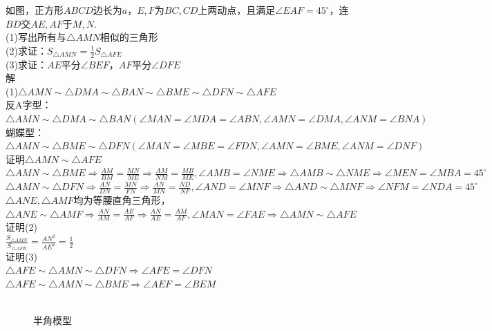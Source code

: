 \begin{example}
    如图，正方形$ABCD$边长为$a$，$E,F$为$BC,CD$上两动点，且满足$\angle EAF=45^\circ$，连$BD$交$AE,AF$于$M,N$. \\
    (1)写出所有与$\triangle AMN$相似的三角形 \\
    (2)求证：$S_{\triangle AMN}=\frac{1}{2}S_{\triangle AFE}$ \\
    (3)求证：$AE$平分$\angle BEF$，$AF$平分$\angle DFE$\\
    解 \\
    (1)$\triangle AMN \sim \triangle DMA \sim \triangle BAN \sim \triangle BME \sim \triangle DFN \sim \triangle AFE$ \\
    反A字型：$\triangle AMN \sim \triangle DMA \sim \triangle BAN(\angle MAN=\angle MDA=\angle ABN,\angle AMN=\angle DMA,\angle ANM=\angle BNA)$ \\
    蝴蝶型：$\triangle AMN \sim \triangle BME \sim \triangle DFN(\angle MAN=\angle MBE=\angle FDN,\angle AMN=\angle BME,\angle ANM=\angle DNF)$ \\
    证明$\triangle AMN \sim \triangle AFE$ \\
    $\triangle AMN\sim\triangle BME\Rightarrow\frac{AM}{BM}=\frac{MN}{ME}\Rightarrow\frac{AM}{NM}=\frac{MB}{ME},\angle AMB=\angle NME\Rightarrow\triangle AMB\sim\triangle NME\Rightarrow\angle MEN=\angle MBA=45^\circ$ \\
    $\triangle AMN\sim\triangle DFN\Rightarrow\frac{AN}{DN}=\frac{MN}{FN}\Rightarrow\frac{AN}{MN}=\frac{ND}{NF},\angle AND=\angle MNF\Rightarrow\triangle AND\sim\triangle MNF\Rightarrow\angle NFM=\angle NDA=45^\circ$ \\
    $\triangle ANE,\triangle AMF$均为等腰直角三角形，$\triangle ANE \sim \triangle AMF \Rightarrow \frac{AN}{AM}=\frac{AE}{AF} \Rightarrow \frac{AN}{AE}=\frac{AM}{AF},\angle MAN=\angle FAE\Rightarrow \triangle AMN \sim \triangle AFE$ \\
    证明(2) \\
    $\frac{S_{\triangle AMN}}{S_{\triangle AFE}}=\frac{AN^2}{AE^2}=\frac{1}{2}$ \\
    证明(3) \\
    $\triangle AFE \sim \triangle AMN \sim \triangle DFN \Rightarrow \angle AFE=\angle DFN$ \\
    $\triangle AFE \sim \triangle AMN \sim \triangle BME \Rightarrow \angle AEF=\angle BEM$ \\
    \\
\end{example}
\begin{figure}[H]
    \centering
    \resizebox{4cm}{!}{}
    \caption{半角模型}
\end{figure}
